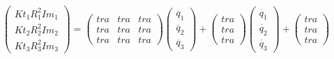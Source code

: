 \begin{equation}
	\begin{pmatrix}
	Kt_{1}R_{1}^{2}Im_{1} \\
	Kt_{2}R_{2}^{2}Im_{2} \\
	Kt_{3}R_{3}^{2}Im_{3}
	\end{pmatrix} =
	\begin{pmatrix}
	tra & tra & tra \\
	tra & tra & tra  \\
	tra & tra & tra
	\end{pmatrix}
	\begin{pmatrix}
	\ddot{q_{1}} \\
	\ddot{q_{2}}  \\
	\ddot{q_{3}}
	\end{pmatrix} +
	\begin{pmatrix}
	tra  \\
	tra   \\
	tra
	\end{pmatrix}
	\begin{pmatrix}
		\dot{q_{1}} \\
		\dot{q_{2}}  \\
		\dot{q_{3}}
	\end{pmatrix} +
\begin{pmatrix}
tra  \\
tra   \\
tra
\end{pmatrix}
\end{equation}



\newpage
